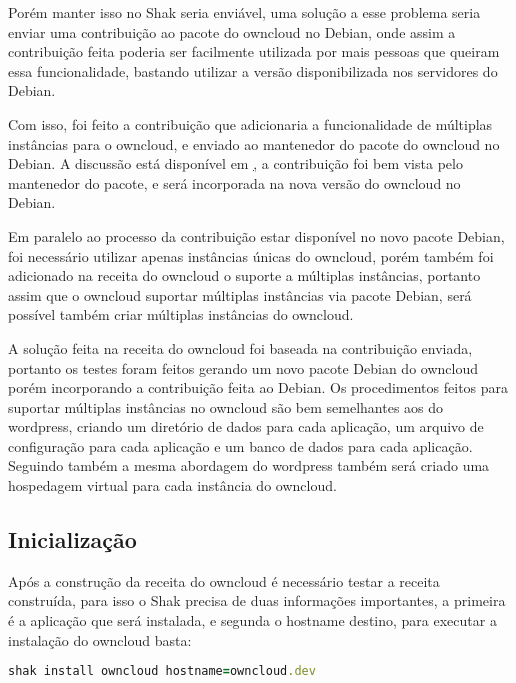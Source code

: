 Porém manter isso no Shak seria enviável, uma solução a esse problema seria enviar
uma contribuição ao pacote do owncloud no Debian, onde assim a contribuição feita
poderia ser facilmente utilizada por mais pessoas que queiram essa funcionalidade,
bastando utilizar a versão disponibilizada nos servidores do Debian. 

Com isso, foi feito a contribuição que adicionaria a funcionalidade de múltiplas 
instâncias para o owncloud, e enviado ao mantenedor do pacote do owncloud no Debian. 
A discussão está disponível em \href{https://bugs.debian.org/cgi-bin/bugreport.cgi?bug=789726},
a contribuição foi bem vista pelo mantenedor do pacote, e será incorporada na nova
versão do owncloud no Debian.

Em paralelo ao processo da contribuição estar disponível no novo pacote Debian,
foi necessário utilizar apenas instâncias únicas do owncloud, porém também foi
adicionado na receita do owncloud o suporte a múltiplas instâncias, portanto
assim que o owncloud suportar múltiplas instâncias via pacote Debian, será possível
também criar múltiplas instâncias do owncloud.

A solução feita na receita do owncloud foi baseada na contribuição enviada, portanto
os testes foram feitos gerando um novo pacote Debian do owncloud porém incorporando
a contribuição feita ao Debian. Os procedimentos feitos para suportar múltiplas instâncias
no owncloud são bem semelhantes aos do wordpress, criando um diretório de dados
para cada aplicação, um arquivo de configuração para cada aplicação e um banco de
dados para cada aplicação. Seguindo também a mesma abordagem do wordpress também
será criado uma hospedagem virtual para cada instância do owncloud.

\subsection{Inicialização}

Após a construção da receita do owncloud é necessário testar a receita construída,
para isso o Shak precisa de duas informações importantes, a primeira é a aplicação
que será instalada, e segunda o hostname destino, para executar a instalação
do owncloud basta:

\begin{lstlisting}[language=Ruby,label=dice_index,caption={Exemplo de execução de instalação do owncloud com shak}]
shak install owncloud hostname=owncloud.dev
\end{lstlisting}

